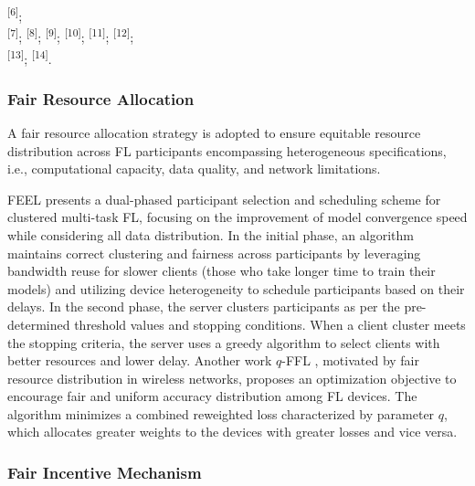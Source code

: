 \documentclass{article}
\begin{document}
\begin{table}[!tb]
\begin{threeparttable}
\begin{tablenotes}
            \textsuperscript{[6]}\cite{hamman2024demystifying_ICLR24};\\
            \textsuperscript{[7]}\cite{ezzeldin}; \textsuperscript{[8]}\cite{NEURIPS2023_2e0d3c6a}; \textsuperscript{[9]}\cite{rankcorefed2024fair}; \textsuperscript{[10]}\cite{shi2023fairness}; \textsuperscript{[11]}\cite{albaseer2023fair}; \textsuperscript{[12]}\cite{Incentive_WWW21}; \\
            \textsuperscript{[13]}\cite{li2020fair_ICLR}; \textsuperscript{[14]}\cite{huang2020efficiency}.
        \end{tablenotes}
    \end{threeparttable}
    \caption{Comparison of the state-of-the-art fairness-oriented approaches in federated learning.}
    \label{table_1}
\end{table}
\subsubsection{Fair Resource Allocation}
\label{subsub_sec: Fair Resource Allocation}
A fair resource allocation strategy is adopted to ensure equitable resource distribution across FL participants encompassing heterogeneous specifications, i.e., computational capacity, data quality, and network limitations.

FEEL \cite{albaseer2023fair} presents a dual-phased participant selection and scheduling scheme for clustered multi-task FL, focusing on the improvement of model convergence speed while considering all data distribution. In the initial phase, an algorithm maintains correct clustering and fairness across participants by leveraging bandwidth reuse for slower clients (those who take longer time to train their models) and utilizing device heterogeneity to schedule participants based on their delays. In the second phase, the server clusters participants as per the pre-determined threshold values and stopping conditions. When a client cluster meets the stopping criteria, the server uses a greedy algorithm to select clients with better resources and lower delay. Another work $q$-FFL \cite{li2020fair_ICLR}, motivated by fair resource distribution in wireless networks, proposes an optimization objective to encourage fair and uniform accuracy distribution among FL devices. The algorithm minimizes a combined reweighted loss characterized by parameter $q$, which allocates greater weights to the devices with greater losses and vice versa. 
 

\subsubsection{Fair Incentive Mechanism}
\label{subsub_sec: Fair Incentive Mechansim}
\end{document}
